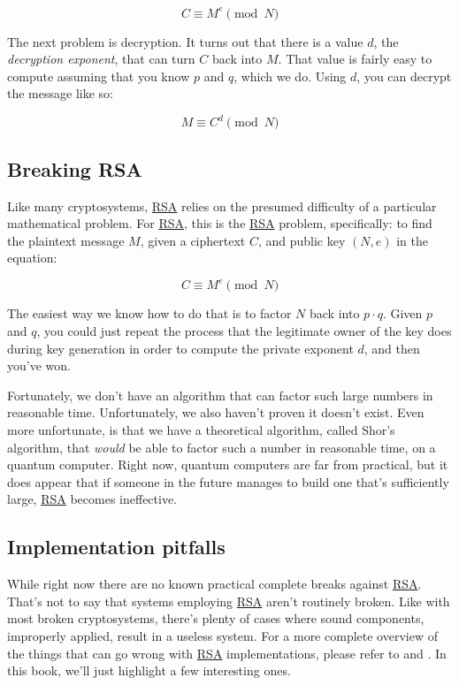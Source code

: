 \documentclass[11pt,ebook,table,dvipsnames]{memoir}
\begin{document}
\[
C \equiv M^e \pmod{N}
\]

The next problem is decryption. It turns out that there is a value
$d$, the \emph{decryption exponent}, that can turn $C$ back into $M$. That
value is fairly easy to compute assuming that you know $p$ and $q$,
which we do. Using $d$, you can decrypt the message like so:

\[
M \equiv C^d \pmod{N}
\]
\subsection{Breaking RSA}
\label{sec-2-5-3-2}

Like many cryptosystems, \hyperref[RSA]{RSA} relies on the presumed difficulty of a
particular mathematical problem. For \hyperref[RSA]{RSA}, this is the \hyperref[RSA]{RSA} problem,
specifically: to find the plaintext message $M$, given a ciphertext
$C$, and public key $(N, e)$ in the equation:

\begin{equation}
C \equiv M^e \pmod{N}
\end{equation}

The easiest way we know how to do that is to factor $N$ back into $p
\cdot q$. Given $p$ and $q$, you could just repeat the process that
the legitimate owner of the key does during key generation in order to
compute the private exponent $d$, and then you've won.

Fortunately, we don't have an algorithm that can factor such large
numbers in reasonable time. Unfortunately, we also haven't proven it
doesn't exist. Even more unfortunate, is that we have a theoretical
algorithm, called Shor's algorithm, that \emph{would} be able to factor
such a number in reasonable time, on a quantum computer. Right now,
quantum computers are far from practical, but it does appear that if
someone in the future manages to build one that's sufficiently large,
\hyperref[RSA]{RSA} becomes ineffective.
\subsection{Implementation pitfalls}
\label{sec-2-5-3-3}

While right now there are no known practical complete breaks against
\hyperref[RSA]{RSA}. That's not to say that systems employing \hyperref[RSA]{RSA} aren't routinely
broken. Like with most broken cryptosystems, there's plenty of cases
where sound components, improperly applied, result in a useless
system. For a more complete overview of the things that can go wrong
with \hyperref[RSA]{RSA} implementations, please refer to \cite{boneh:twentyyears} and
\cite{anderson:mindingyourpsandqs}. In this book, we'll just highlight
a few interesting ones.
\end{document}
